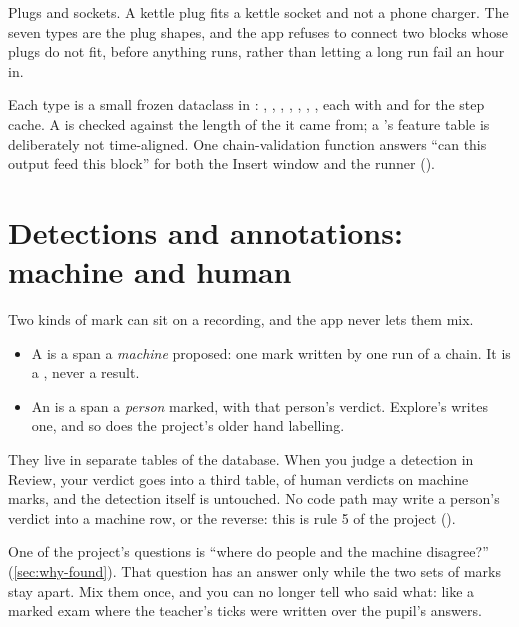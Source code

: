 \begin{plainterms}
Plugs and sockets. A kettle plug fits a kettle socket and not a phone charger. The seven
types are the plug shapes, and the app refuses to connect two blocks whose plugs do not fit,
before anything runs, rather than letting a long run fail an hour in.
\end{plainterms}

\begin{underthehood}
Each type is a small frozen dataclass in : ,
, , , , ,
, each with  and  for the step cache. A
 is checked against the length of the  it came from; a
's feature table is deliberately not time-aligned. One chain-validation
function answers ``can this output feed this block'' for both the Insert window and the
runner ().
\end{underthehood}

\section{Detections and annotations: machine and human}\label{sec:core-ideas-detections}
Two kinds of mark can sit on a recording, and the app never lets them mix.
\begin{itemize}
  \item A  is a span a \emph{machine} proposed: one mark written by
    one run of a chain. It is a , never a result.
  \item An  is a span a \emph{person} marked, with that person's
    verdict. Explore's  writes one, and so does the project's older
    hand labelling.
\end{itemize}
They live in separate tables of the database. When you judge a detection in Review, your
verdict goes into a third table, of human verdicts on machine marks, and the detection itself
is untouched. No code path may write a person's verdict into a machine row, or the reverse:
this is rule 5 of the project ().

\begin{plainterms}
One of the project's questions is ``where do people and the machine disagree?''
(\cref{sec:why-found}). That question has an answer only while the two sets of marks stay
apart. Mix them once, and you can no longer tell who said what: like a marked exam where the
teacher's ticks were written over the pupil's answers.
\end{plainterms}

